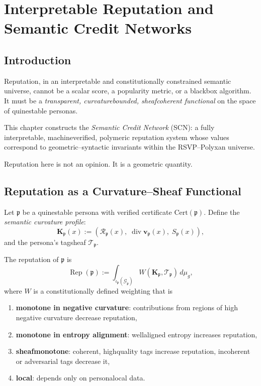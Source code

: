 \chapter{Interpretable Reputation and Semantic Credit Networks}
\label{ch:semantic-reputation}

\section{Introduction}

Reputation, in an interpretable and constitutionally constrained semantic
universe, cannot be a scalar score, a popularity metric, or a
black\textendash box algorithm.  
It must be a \emph{transparent, curvature\textendash bounded,
sheaf\textendash coherent functional}
on the space of quine\textendash stable personas.

This chapter constructs the \emph{Semantic Credit Network} (SCN):
a fully interpretable, machine\textendash verified,
polymeric reputation system whose values correspond to
geometric–syntactic invariants within the RSVP–Polyxan universe.

Reputation here is not an opinion.
It is a geometric quantity.

\section{Reputation as a Curvature–Sheaf Functional}

Let $\mathfrak{p}$ be a quine\textendash stable persona with verified certificate
$\mathrm{Cert}(\mathfrak{p})$.
Define the \emph{semantic curvature profile}:
\[
\mathbf{K}_{\mathfrak{p}}(x) := 
\left(
    \mathcal{R}_{\mathfrak{p}}(x), \;
    \operatorname{div} \mathbf{v}_{\mathfrak{p}}(x), \;
    S_{\mathfrak{p}}(x)
\right),
\]
and the persona’s tag\textendash sheaf $\mathscr{T}_{\mathfrak{p}}$.

\begin{definition}
The reputation of $\mathfrak{p}$ is
\[
\operatorname{Rep}(\mathfrak{p})
  := \int_{\iota_{\mathfrak{p}}(\mathcal{G}_{\mathfrak{p}})}
      W\!\left(
        \mathbf{K}_{\mathfrak{p}},
        \mathscr{T}_{\mathfrak{p}}
      \right) \, d\mu_g,
\]
where $W$ is a constitutionally defined weighting that is

\begin{enumerate}
  \item \textbf{monotone in negative curvature}: contributions from regions of high negative curvature decrease reputation,
  \item \textbf{monotone in entropy alignment}: well\textendash aligned entropy increases reputation,
  \item \textbf{sheaf\textendash monotone}: coherent, high\textendash quality tags increase reputation, incoherent or adversarial tags decrease it,
  \item \textbf{local}: depends only on persona\textendash local data.
\end{enumerate}
\end{definition}

